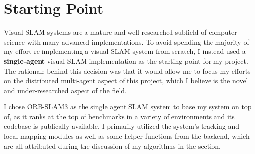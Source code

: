 




\label{sec:2}

\section{Starting Point}
\label{sec:starting-point}
Visual SLAM systems are a mature and well-researched subfield of computer science with many advanced implementations. To avoid spending the majority of my effort re-implementing a visual SLAM system from scratch, I instead used a \textbf{single-agent} visual SLAM implementation as the starting point for my project. The rationale behind this decision was that it would allow me to focus my efforts on the distributed multi-agent aspect of this project, which I believe is the novel and under-researched aspect of the field.

I chose ORB-SLAM3 \autocite{ORBSLAM3_TRO} as the single agent SLAM system to base my system on top of, as it ranks at the top of benchmarks in a variety of environments \autocite{DBLP:journals/corr/abs-2108-01654} and its codebase is publically available. I primarily utilized the system's tracking and local mapping modules as well as some helper functions from the backend, which are all attributed during the discussion of my algorithms in the  section.

